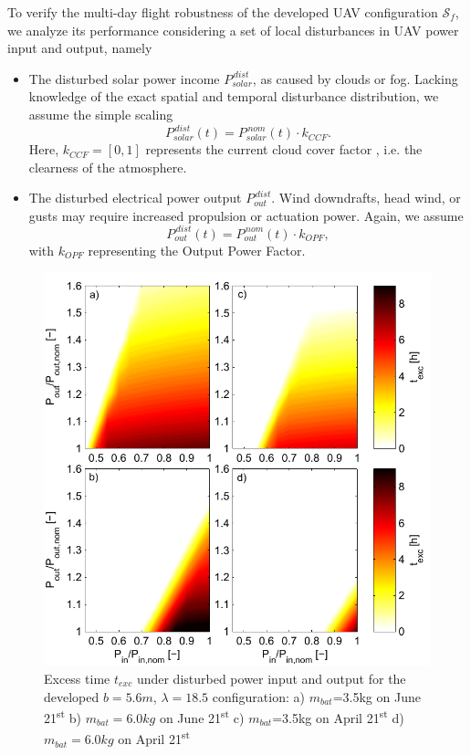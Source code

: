 To verify the multi-day flight robustness of the developed UAV configuration $\mathcal{S}_f$, we analyze its performance considering a set of local disturbances in UAV power input and output, namely
\begin{itemize}
\item The disturbed solar power income $P_{solar}^{\,dist}$, as caused by clouds or fog. Lacking knowledge of the exact spatial and temporal disturbance distribution, we assume the simple scaling
\begin{equation}
P_{solar}^{\,dist}(t) = P_{solar}^{\,nom}(t) \cdot k_{CCF}.
\end{equation}
Here, $k_{CCF}=[0,1]$  represents the current cloud cover factor \cite{Kimura_SolarRadAndClouds}, i.e. the clearness of the atmosphere.
\item The disturbed electrical power output $P_{out}^{\,dist}$. Wind downdrafts, head wind, or gusts may require increased propulsion or actuation power. Again, we assume 
\begin{equation}
P_{out}^{\,dist}(t) = P_{out}^{\,nom}(t) \cdot k_{OPF},
\end{equation}
with $k_{OPF}$ representing the Output Power Factor.
\end{itemize}
\begin{figure}
    \centering
    \includegraphics[width=\linewidth]{images/5_texcRobustness}
    \caption{Excess time $t_{exc}$ under disturbed power input and output for the developed $b=5.6m$, $\lambda=18.5$ configuration: a) $m_{bat}$=3.5kg on June 21\textsuperscript{st} b) $m_{bat}=6.0kg$ on June 21\textsuperscript{st} c) $m_{bat}$=3.5kg on April 21\textsuperscript{st} d) $m_{bat}=6.0kg$ on April 21\textsuperscript{st} }
    \label{fig:ExcessTimeRobustness}
\end{figure}
